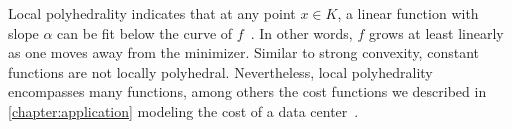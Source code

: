 Local polyhedrality indicates that at any point $x \in K$, a linear function with slope $\alpha$ can be fit below the curve of $f$~\cite{Goel2018}. In other words, $f$ grows at least linearly as one moves away from the minimizer. Similar to strong convexity, constant functions are not locally polyhedral. Nevertheless, local polyhedrality encompasses many functions, among others the cost functions we described in \cref{chapter:application} modeling the cost of a data center~\cite{Goel2018}.
